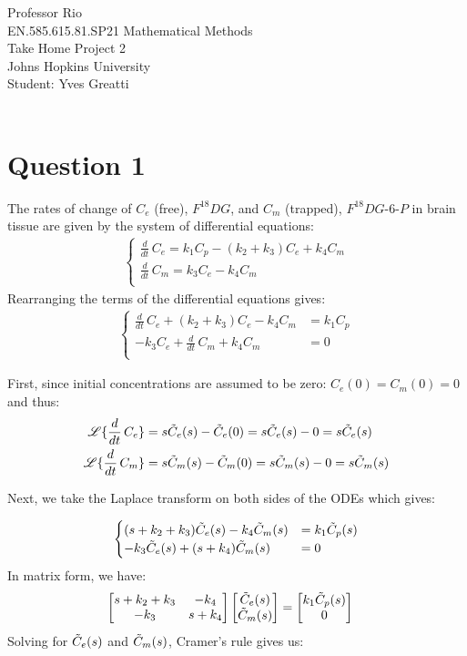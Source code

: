 \documentclass[12pt,twoside]{article}
\begin{document}
\noindent Professor Rio\\
EN.585.615.81.SP21 Mathematical Methods\\
Take Home Project 2\\
Johns Hopkins University\\
Student: Yves Greatti\\\

\section*{Question 1}

The rates of change of $C_e$ (free), $F^{18}DG$,  and $C_m$ (trapped), $F^{18}DG$-$6$-$P$
in brain tissue  are given by the system of differential equations:
\begin{align*}
	\begin{cases}
		\frac{d}{dt} \, C_e  = k_1 C_p - (k_2 + k_3) C_e + k_4 C_m \\
		\frac{d}{dt} \, C_m = k_3 C_e -  k_4 C_m \\
	\end{cases}
\end{align*}
Rearranging the terms of the differential equations gives:
\begin{align*}
	\begin{cases}
		\frac{d}{dt} \, C_e  + (k_2 + k_3) C_e - k_4 C_m  &= k_1 C_p \\
		- k_3 C_e + \frac{d}{dt} \, C_m + k_4 C_m  &= 0\\
	\end{cases}
\end{align*}

First, since initial concentrations are assumed to be zero: $C_e(0) = C_m(0) = 0$ and thus:
\begin{align*}
\mathscr{L}\{ \frac{d}{dt} \, C_e  \} &= s \tilde{ C }_e(s) - \tilde{ C }_e(0) = s \tilde{ C }_e(s) - 0 = s \tilde{ C }_e(s) \\
\mathscr{L}\{ \frac{d}{dt} \, C_m  \} &= s \tilde{ C }_m(s) - \tilde{ C }_m(0) = s \tilde{ C }_m(s) - 0 = s \tilde{ C }_m(s) \\
\end{align*}

Next, we take the Laplace transform on both sides of the ODEs which gives:

\begin{align*}
	\begin{cases}
		(s + k_2 + k_3)  \tilde{ C }_e(s)  - k_4 \tilde{ C }_m(s) &= k_1 \tilde{ C }_p(s) \\
		-k_3  \tilde{ C }_e(s)  + (s + k_4) \tilde{ C }_m(s) &=  0
	\end{cases}
\end{align*}
 In matrix form, we have:
\begin{align*}
 \begin{bmatrix} s + k_2 + k_3 & -k_4 \\ -k_3 & s + k_4 \end{bmatrix} \begin{bmatrix}  \tilde{ C }_e(s) \\  \tilde{ C }_m(s) \end{bmatrix} &= \begin{bmatrix} k_1 \tilde{ C }_p(s)  \\ 0 \end{bmatrix}
\end{align*}
Solving for $\tilde{ C }_e(s)$ and $\tilde{ C }_m(s)$, Cramer's rule gives us:
\end{document}
